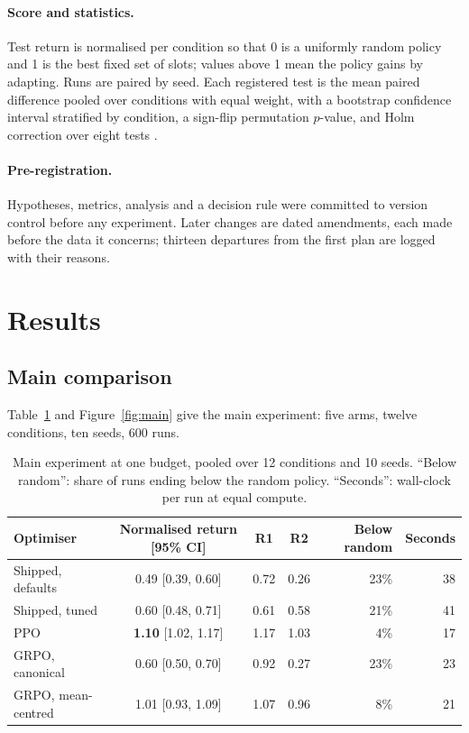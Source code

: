 \documentclass[11pt,a4paper]{article}
\begin{document}
\paragraph{Score and statistics.} Test return is normalised per condition so that 0 is a uniformly random policy
and 1 is the best fixed set of slots; values above 1 mean the policy gains by adapting. Runs are paired by seed.
Each registered test is the mean paired difference pooled over conditions with equal weight, with a bootstrap
confidence interval stratified by condition, a sign-flip permutation $p$-value, and Holm correction over eight
tests \citep{agarwal2021precipice}.

\paragraph{Pre-registration.} Hypotheses, metrics, analysis and a decision rule were committed to version control
before any experiment. Later changes are dated amendments, each made before the data it concerns; thirteen
departures from the first plan are logged with their reasons.

\section{Results}

\subsection{Main comparison}

Table~\ref{tab:main} and Figure~\ref{fig:main} give the main experiment: five arms, twelve conditions, ten seeds,
600 runs.

\begin{table}[t]
\centering\small
\begin{tabular}{lcccrr}
\toprule
Optimiser & Normalised return [95\% CI] & R1 & R2 & Below random & Seconds \\
\midrule
Shipped, defaults & 0.49 [0.39, 0.60] & 0.72 & 0.26 & 23\% & 38 \\
Shipped, tuned & 0.60 [0.48, 0.71] & 0.61 & 0.58 & 21\% & 41 \\
PPO & \textbf{1.10} [1.02, 1.17] & 1.17 & 1.03 & 4\% & 17 \\
GRPO, canonical & 0.60 [0.50, 0.70] & 0.92 & 0.27 & 23\% & 23 \\
GRPO, mean-centred & 1.01 [0.93, 1.09] & 1.07 & 0.96 & 8\% & 21 \\
\bottomrule
\end{tabular}
\caption{Main experiment at one budget, pooled over 12 conditions and 10 seeds. ``Below random'': share of runs
ending below the random policy. ``Seconds'': wall-clock per run at equal compute.}
\label{tab:main}
\end{table}
\end{document}

